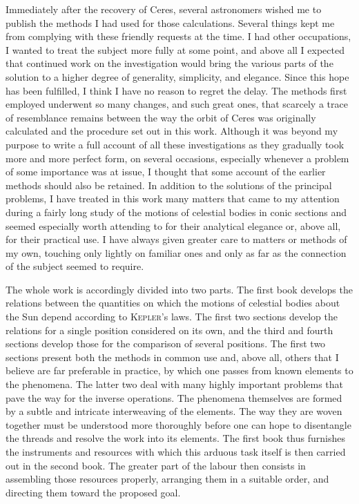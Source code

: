 Immediately after the recovery of Ceres, several astronomers wished me to publish the methods I had used for those calculations. Several things kept me from complying with these friendly requests at the time. I had other occupations, I wanted to treat the subject more fully at some point, and above all I expected that continued work on the investigation would bring the various parts of the solution to a higher degree of generality, simplicity, and elegance. Since this hope has been fulfilled, I think I have no reason to regret the delay. The methods first employed underwent so many changes, and such great ones, that scarcely a trace of resemblance remains between the way the orbit of Ceres was originally calculated and the procedure
set out in this work. Although it was beyond my purpose to write a full account of all these investigations as they gradually took more and more perfect form, on several occasions, especially whenever a problem of some importance was at issue, I thought that some account of the earlier methods should also be retained. In addition to the solutions of the principal problems, I have treated in this work many matters that came to my attention during a fairly long study of the motions of celestial bodies in conic sections and seemed especially worth attending to for their analytical elegance or, above all, for their practical use. I have always given greater care to matters or methods of my own, touching only lightly on familiar ones and only as far as the connection of the subject seemed to require.

The whole work is accordingly divided into two parts. The first book develops the relations between the quantities on which the motions of celestial bodies about the Sun depend according to \textsc{Kepler}'s laws. The first two sections develop the relations for a single position considered on its own, and the third and fourth sections develop those for the comparison of several positions. The first two sections present both the methods in common use and, above all, others that I believe are far preferable in practice, by which one passes from known elements to the phenomena. The latter two deal with many highly important problems that pave the way for the inverse operations. The phenomena themselves are formed by a subtle and intricate interweaving of the elements. The way they are woven together must be understood more thoroughly before one can hope to disentangle the threads and resolve the work into its elements. The first book thus furnishes the instruments and resources with which this arduous task itself is then carried out in the second book. The greater part of the labour then consists in assembling those resources properly, arranging them in a suitable order, and directing them toward the proposed goal.

